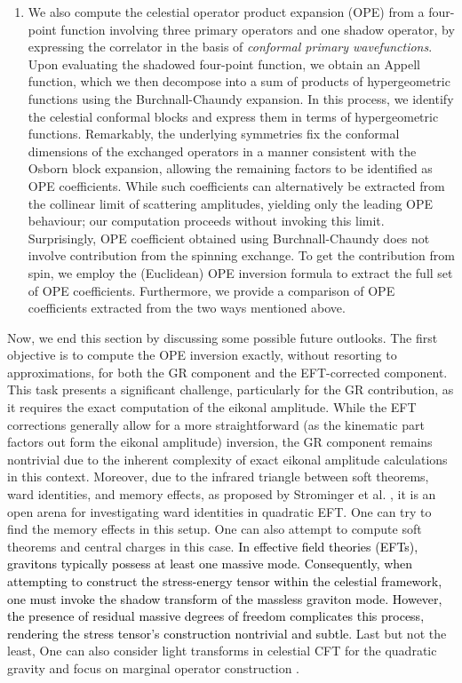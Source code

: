 \begin{enumerate}
\item  We also compute the celestial operator product expansion (OPE) from a four-point function involving three primary operators and one shadow operator, by expressing the correlator in the basis of \textit{conformal primary wavefunctions}. Upon evaluating the shadowed four-point function, we obtain an Appell function, which we then decompose into a sum of products of hypergeometric functions using the Burchnall-Chaundy expansion. In this process, we identify the celestial conformal blocks and express them in terms of hypergeometric functions. Remarkably, the underlying symmetries fix the conformal dimensions of the exchanged operators in a manner consistent with the Osborn block expansion, allowing the remaining factors to be identified as OPE coefficients.
While such coefficients can alternatively be extracted from the collinear limit of scattering amplitudes, yielding only the leading OPE behaviour; our computation proceeds without invoking this limit. Surprisingly, OPE coefficient obtained using Burchnall-Chaundy 
 does not involve contribution from the spinning exchange. To get the contribution from spin,  we employ the (Euclidean) OPE inversion formula to extract the full set of OPE coefficients. Furthermore, we provide a comparison of OPE coefficients extracted from the two ways mentioned above.
\end{enumerate}
\noindent
Now, we end this section by discussing some possible future outlooks. The first objective is to compute the OPE inversion exactly, without resorting to approximations, for both the GR component and the EFT-corrected component. This task presents a significant challenge, particularly for the GR contribution, as it requires the exact computation of the eikonal amplitude. While the EFT corrections generally allow for a more straightforward  (as the kinematic part factors out form the eikonal amplitude) inversion, the GR component remains nontrivial due to the inherent complexity of exact eikonal amplitude calculations in this context. Moreover, due to the infrared triangle between soft theorems, ward identities, and memory effects, as proposed by Strominger et al. \cite{Strominger:2017zoo,Pate:2017fgt}, it is an open arena for investigating ward identities in quadratic EFT. One can try to find the memory effects in this setup. One can also attempt to compute soft theorems and central charges in this case. \textcolor{black}{In effective field theories (EFTs), gravitons typically possess at least one massive mode. Consequently, when attempting to construct the stress-energy tensor within the celestial framework, one must invoke the shadow transform of the massless graviton mode. However, the presence of residual massive  degrees of freedom complicates this process, rendering the stress tensor's construction nontrivial and subtle}. Last but not the least, One can also consider light transforms in celestial CFT for the quadratic gravity and focus on marginal operator construction \cite{Banerjee:2022hgc,Narayanan:2024qgb,Banerjee:2024hvb}.

